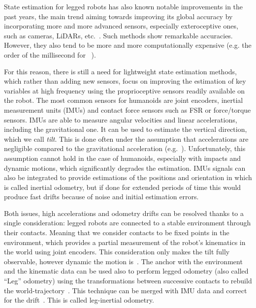 \documentclass{IJCAS}
\begin{document}
State estimation for legged robots has also known notable improvements in the past years, the main trend aiming towards improving its global accuracy by incorporating more and more advanced sensors, especially exteroceptive ones, such as cameras, LiDARs, etc.~\cite{wisth2022vilens, fallon2018AccRobLocWalkRobotsImuVisLidar, Kuang2024TightlyCoupledLidarImuUwb}. Such methods show remarkable accuracies. However, they also tend to be more and more computationally expensive (e.g. the order of the millisecond for ~\cite{Kuang2024TightlyCoupledLidarImuUwb}).

For this reason, there is still a need for lightweight state estimation methods, which rather than adding new sensors, focus on improving the estimation of key variables at high frequency using the proprioceptive sensors readily available on the robot. The most common sensors for humanoids are joint encoders, inertial measurement units (IMUs) and contact force sensors such as FSR or force/torque sensors. IMUs are able to measure angular velocities and linear accelerations, including the gravitational one. It can be used to estimate the vertical direction, which we call \emph{tilt}. This is done often under the assumption that accelerations are negligible compared to the gravitational acceleration (e.g.~\cite{mahony2008NonlinearComplementaryFiltersOnSO3}). Unfortunately, this assumption cannot hold in the case of humanoids, especially with impacts and dynamic motions, which significantly degrades the estimation. IMUs signals can also be integrated to provide estimations of the positions and orientation in which is called inertial odometry, but if done for extended periods of time this would produce fast drifts because of noise and initial estimation errors.

Both issues, high accelerations and odometry drifts can be resolved thanks to a single consideration: legged robots are connected to a stable environment through their contacts. Meaning that we consider contacts to be fixed points in the environment, which provides a partial measurement of the robot's kinematics in the world using joint encoders. This consideration only makes the tilt fully observable, however dynamic the motion is~\cite{benallegue2020LyapunovStableOrientationEstimatorHumanoids}. The anchor with the environment and the kinematic data can be used also to perform legged odometry (also called ``Leg'' odometry) using the transformations between successive contacts to rebuild the world-trajectory~\cite{Lin2005ALegConfigurationMeasSystemHexapod}. This technique can be merged with IMU data and correct for the drift~\cite{bloesch2013FusionLegKineAndImu, Wawrzynski2015RobustEstVelocityTilt, masuya2015DeadReckoningAnchoringPivot}. This is called leg-inertial odometry.
\end{document}
